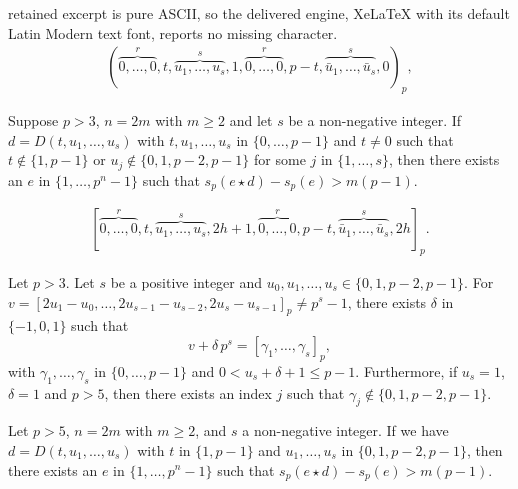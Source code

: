 \documentclass[10pt,a4paper]{amsart}
\newcommand{\comp}[1]{\bar{#1}}
\newcommand{\wt}{s_p}
\begin{document}
retained excerpt is pure ASCII, so the delivered engine, XeLaTeX with its default Latin Modern text font, reports no missing character.
\begin{align}
\label{eq:general_form}
(\overbrace{0,\dots,0}^{r}, t, \overbrace{u_1,\dots,u_s}^{s},1,\overbrace{0,\dots,0}^{r},p-t, \overbrace{\comp{u}_1,\dots,\comp{u}_s}^s,0)_p,
\end{align} 

\begin{lemma} \label{lem:power_2_finite}
Suppose $p>3$, $n = 2m$ with $m \geq 2$ and let $s$ be a non-negative integer. If $d = D(t,u_1,\dots,u_s)$ with $t, u_1,\dots,u_s$ in $\{0,\dots,p-1\}$ and $t\neq 0$ such that $t \notin\{1,p-1\}$ or $u_j \notin \{0,1,p-2,p-1\}$ for some $j$ in $\{1,\dots,s\}$, then there exists an  $e$ in $\{1,\dots,p^n-1\}$ such that $\wt(e \star d) - \wt(e) > m(p-1)$.
\end{lemma}

\begin{align}
\label{eq:de}
    [\overbrace{0,\dots,0}^r,t,\overbrace{u_1,\dots,u_s}^s,2h+1,\overbrace{0,\dots,0}^r,p-t,\overbrace{\comp{u}_1,\dots,\comp{u}_s}^s,2h]_p.
\end{align}

\begin{lemma}
\label{lem:technical}
Let $p > 3$. Let $s$ be a positive integer and $u_0,u_1,\dots,u_s \in \{0,1,p-2,p-1\}$. For $v = [2u_1-u_0,\dots,2u_{s-1}-u_{s-2},2u_s -u_{s-1}]_p \neq p^s-1$, there exists $\delta$ in $\{-1, 0, 1\}$ such that
\begin{equation*}
v + \delta\,p^s =  [\gamma_1,\dots,\gamma_s]_p,
\end{equation*}
with $\gamma_1, \ldots, \gamma_s$ in $\{0, \ldots, p - 1\}$ and $0 < u_s + \delta + 1 \le p - 1$.
Furthermore, if $u_s = 1$, $\delta = 1$ and $p > 5$, then there exists an index $j$ such that $\gamma_j \not\in \{0, 1, p - 2, p - 1\}$.
\end{lemma}

\begin{lemma}
\label{lem:remaining_p7}
Let $p>5$, $n = 2m$ with $m \geq 2$, and $s$ a non-negative integer. If we have $d = D(t,u_1,\dots,u_s)$ with $t$ in $\{1,p-1\}$ and $u_1,\ldots,u_s$ in $\{0,1,p-2,p-1\}$, then there exists an $e$ in $\{1,\dots,p^n-1\}$ such that $\wt(e \star d) - \wt(e) > m(p-1)$.
\end{lemma}
\end{document}
